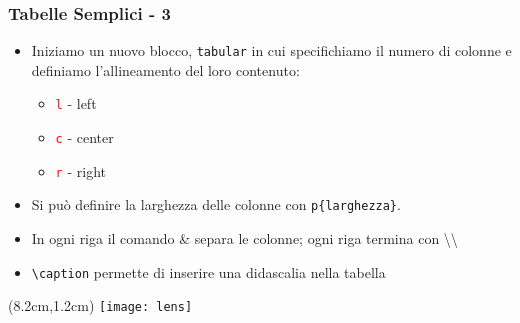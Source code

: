 \begin{frame}
  \frametitle{Tabelle Semplici - 3}
  \vspace{1,7cm}
  \begin{itemize}
    \item<1-> Iniziamo un nuovo blocco, \texttt{tabular} in cui specifichiamo
il numero di colonne e definiamo l'allineamento del loro contenuto:
    \begin{itemize}
      \item<2-> \texttt{\textcolor{red}{l}} - left
      \item<3-> \texttt{\textcolor{red}{c}} - center
      \item<4-> \texttt{\textcolor{red}{r}} - right
    \end{itemize}
   \item<5-> Si può definire la larghezza delle colonne con
\texttt{p\{larghezza\}}.
   \item<6-> In ogni riga il comando \& separa le colonne; ogni riga termina
con \textbackslash \textbackslash
   \item<7-> \texttt{\textbackslash caption} permette di inserire una 
didascalia nella tabella      
  \end{itemize}

  \begin{textblock*}{5cm}(8.2cm,1.2cm)
   \texttt{[image: lens]}
  \end{textblock*}

\end{frame}
